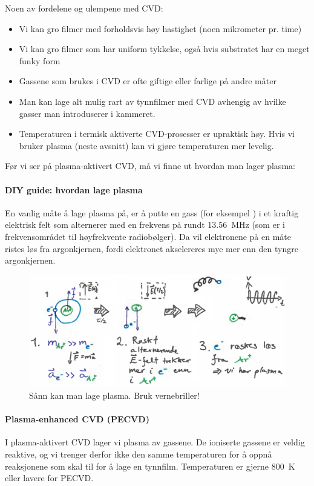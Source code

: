 Noen av fordelene og ulempene med CVD:
\begin{itemize}
	\item Vi kan gro filmer med forholdsvis høy hastighet (noen mikrometer pr. time)
	\item Vi kan gro filmer som har uniform tykkelse, også hvis substratet har en meget funky form
	\item Gassene som brukes i CVD er ofte giftige eller farlige på andre måter
	\item Man kan lage alt mulig rart av tynnfilmer med CVD avhengig av hvilke gasser man introduserer i kammeret.
	\item Temperaturen i termisk aktiverte CVD-prosesser er upraktisk høy. Hvis vi bruker plasma (neste avsnitt) kan vi gjøre temperaturen mer levelig.
\end{itemize}
Før vi ser på plasma-aktivert CVD, må vi finne ut hvordan man lager plasma:

\paragraph{DIY guide: hvordan lage plasma} En vanlig måte å lage plasma på, er å putte en gass (for eksempel ) i et kraftig elektrisk felt som alternerer med en frekvens på rundt \SI{13.56}{\mega\hertz} (som er i frekvensområdet til høyfrekvente radiobølger). Da vil elektronene på en måte ristes løs fra argonkjernen, fordi elektronet akselereres mye mer enn den tyngre argonkjernen.
\begin{figure}[H]
\bmd\centering
\includegraphics[width=\linewidth]{metodefigs/plasmagen.png}
\caption{Sånn kan man lage plasma. Bruk vernebriller!}
\emd\end{figure}

\paragraph{Plasma-enhanced CVD (PECVD)} I plasma-aktivert CVD lager vi plasma av gassene. De ioniserte gassene er veldig reaktive, og vi trenger derfor ikke den samme temperaturen for å oppnå reaksjonene som skal til for å lage en tynnfilm. Temperaturen er gjerne \SI{800}{\kelvin} eller lavere for PECVD.

